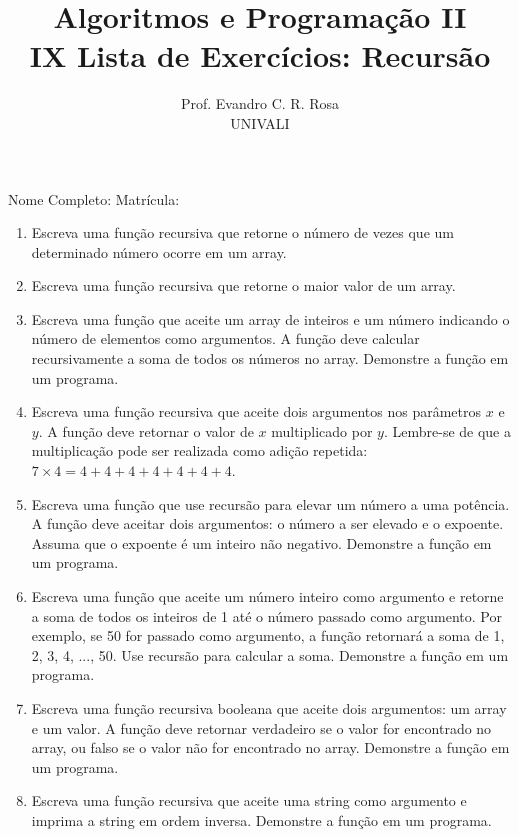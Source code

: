 \documentclass[12pt]{article}
\title{Algoritmos e Programação II\\
\large IX Lista de Exercícios: Recursão}
\author{Prof. Evandro C. R. Rosa\\UNIVALI}
\date{}
\begin{document}
\maketitle

\noindent Nome Completo: \underline{\hspace{8cm}} Matrícula: \underline{\hspace{2.4cm}}
\begin{enumerate}
  \item Escreva uma função recursiva que retorne o número de vezes que um determinado número ocorre em um array.
  \item Escreva uma função recursiva que retorne o maior valor de um array.
  \item Escreva uma função que aceite um array de inteiros e um número indicando o número de elementos como argumentos. A função deve calcular recursivamente a soma de todos os números no array. Demonstre a função em um programa.
  \item Escreva uma função recursiva que aceite dois argumentos nos parâmetros \( x \) e \( y \). A função deve retornar o valor de \( x \) multiplicado por \( y \). Lembre-se de que a multiplicação pode ser realizada como adição repetida: \( 7 \times 4 = 4 + 4 + 4 + 4 + 4 + 4 + 4 \).
  \item Escreva uma função que use recursão para elevar um número a uma potência. A função deve aceitar dois argumentos: o número a ser elevado e o expoente. Assuma que o expoente é um inteiro não negativo. Demonstre a função em um programa.
  \item Escreva uma função que aceite um número inteiro como argumento e retorne a soma de todos os inteiros de 1 até o número passado como argumento. Por exemplo, se 50 for passado como argumento, a função retornará a soma de 1, 2, 3, 4, ..., 50. Use recursão para calcular a soma. Demonstre a função em um programa.
  \item Escreva uma função recursiva booleana que aceite dois argumentos: um array e um valor. A função deve retornar verdadeiro se o valor for encontrado no array, ou falso se o valor não for encontrado no array. Demonstre a função em um programa.
  \item Escreva uma função recursiva que aceite uma string como argumento e imprima a string em ordem inversa. Demonstre a função em um programa.
\end{enumerate}
\end{document}
